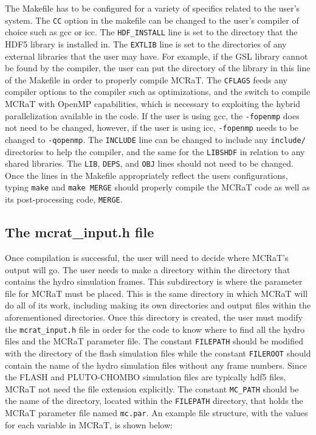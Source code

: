 \documentclass[12pt,a4paper]{article}
\begin{document}
The Makefile has to be configured for a variety of specifics related to the user's system. The \texttt{CC} option in the makefile can be changed to the user's compiler of choice such as gcc or icc. The \texttt{HDF\_INSTALL} line is set to the directory that the HDF5 library is installed in. The \texttt{EXTLIB} line is set to the directories of any external libraries that the user may have. For example, if the GSL library cannot be found by the compiler, the user can put the directory of the library in this line of the Makefile in order to properly compile MCRaT. The \texttt{CFLAGS} feeds any compiler options to the compiler such as optimizations, and the switch to compile MCRaT with OpenMP capabilities, which is necessary to exploiting the hybrid parallelization available in the code. If the user is using gcc, the \texttt{-fopenmp} does not need to be changed, however, if the user is using icc, \texttt{-fopenmp} needs to be changed to \texttt{-qopenmp}. The \texttt{INCLUDE} line can be changed to include any \texttt{include/} directories to help the compiler, and the same for the \texttt{LIBSHDF} in relation to any shared libraries. The \texttt{LIB}, \texttt{DEPS}, and \texttt{OBJ} lines should not need to be changed. Once the lines in the Makefile appropriately reflect the users configurations, typing \texttt{make} and \texttt{make MERGE} should properly compile the MCRaT code as well as its post-processing code, \texttt{MERGE}.

\subsection{The mcrat\_input.h file}
Once compilation is successful, the user will need to decide where MCRaT's output will go. The user needs to make a directory within the directory that contains the hydro simulation frames. This subdirectory is where the parameter file for MCRaT must be placed. This is the same directory in which MCRaT will do all of its work, including making its own directories and output files within the aforementioned directories. Once this directory is created, the user must modify the \texttt{mcrat\_input.h} file in order for the code to know where to find all the hydro files and the MCRaT parameter file. The constant \texttt{FILEPATH} should be modified with the directory of the flash simulation files while the constant \texttt{FILEROOT} should contain the name of the hydro simulation files without any frame numbers. Since the FLASH and PLUTO-CHOMBO simulation files are typically hdf5 files, MCRaT not need the file extension explicitly. The constant \texttt{MC\_PATH} should be the name of the directory, located within the \texttt{FILEPATH} directory, that holds the MCRaT parameter file named \texttt{mc.par}. An example file structure, with the values for each variable in MCRaT, is shown below: \\
\begin{figure}[h!]
\end{figure}
\end{document}
